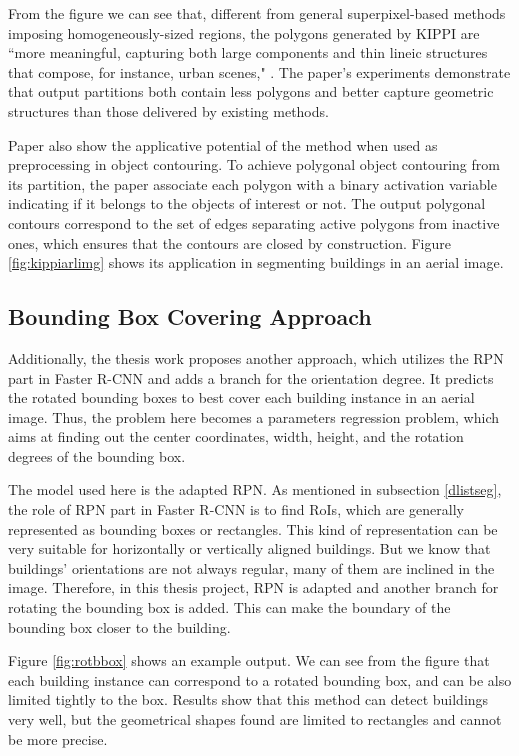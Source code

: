 From the figure we can see that, different from general superpixel-based methods imposing homogeneously-sized regions, the polygons generated by KIPPI are ``more meaningful, capturing both large components and thin lineic structures that compose, for instance, urban scenes," \cite{kippi}. The paper's experiments demonstrate that output partitions both contain less polygons and better capture geometric structures than those delivered by existing methods.



Paper \cite{kippi} also show the applicative potential of the method when used as preprocessing in object contouring. To achieve polygonal object contouring from its partition, the paper associate each polygon with a binary activation variable indicating if it belongs to the objects of interest or not. The output polygonal contours correspond to the set of edges separating active polygons from inactive ones, which ensures that the contours are closed by construction. Figure \ref{fig:kippiarlimg} shows its application in segmenting buildings in an aerial image.

\subsection{Bounding Box Covering Approach}\label{bboxapp}
Additionally, the thesis work \cite{msnadine} proposes another approach, which utilizes the RPN part in Faster R-CNN \cite{fasterrcnn} and adds a branch for the orientation degree. It predicts the rotated bounding boxes to best cover each building instance in an aerial image. Thus, the problem here becomes a parameters regression problem, which aims at finding out the center coordinates, width, height, and the rotation degrees of the bounding box. 

The model used here is the adapted RPN. As mentioned in subsection \ref{dlistseg}, the role of RPN part in Faster R-CNN is to find RoIs, which are generally represented as bounding boxes or rectangles. This kind of representation can be very suitable for horizontally or vertically aligned buildings. But we know that buildings' orientations are not always regular, many of them are inclined in the image. Therefore, in this thesis project, RPN is adapted and another branch for rotating the bounding box is added. This can make the boundary of the bounding box closer to the building.

Figure \ref{fig:rotbbox} shows an example output. We can see from the figure that each building instance can correspond to a rotated bounding box, and can be also limited tightly to the box. Results show that this method can detect buildings very well, but the geometrical shapes found are limited to rectangles and cannot be more precise.

